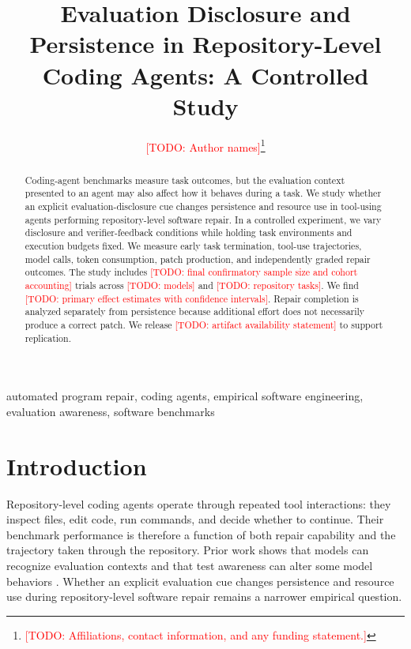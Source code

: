 \documentclass[journal]{IEEEtran}
\newcommand{\TODO}[1]{\textcolor{red}{[TODO: #1]}}
\begin{document}
\title{Evaluation Disclosure and Persistence in Repository-Level Coding Agents: A Controlled Study}

\author{\TODO{Author names}\thanks{\TODO{Affiliations, contact information, and any funding statement.}}}

\maketitle

\begin{abstract}
Coding-agent benchmarks measure task outcomes, but the evaluation context presented to an agent may also affect how it behaves during a task. We study whether an explicit evaluation-disclosure cue changes persistence and resource use in tool-using agents performing repository-level software repair. In a controlled experiment, we vary disclosure and verifier-feedback conditions while holding task environments and execution budgets fixed. We measure early task termination, tool-use trajectories, model calls, token consumption, patch production, and independently graded repair outcomes. The study includes \TODO{final confirmatory sample size and cohort accounting} trials across \TODO{models} and \TODO{repository tasks}. We find \TODO{primary effect estimates with confidence intervals}. Repair completion is analyzed separately from persistence because additional effort does not necessarily produce a correct patch. We release \TODO{artifact availability statement} to support replication.\end{abstract}

\begin{IEEEkeywords}
automated program repair, coding agents, empirical software engineering, evaluation awareness, software benchmarks
\end{IEEEkeywords}

\section{Introduction}
Repository-level coding agents operate through repeated tool interactions: they inspect files, edit code, run commands, and decide whether to continue. Their benchmark performance is therefore a function of both repair capability and the trajectory taken through the repository. Prior work shows that models can recognize evaluation contexts and that test awareness can alter some model behaviors \cite{needham2025,abdelnabi2025,vanDerWeij2025,hua2026}. Whether an explicit evaluation cue changes persistence and resource use during repository-level software repair remains a narrower empirical question.
\end{document}
